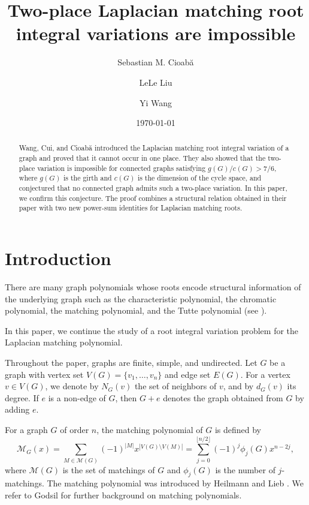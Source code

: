 \documentclass[11pt]{amsart}
\title{Two-place Laplacian matching root integral variations are impossible}
\author[S.M. Cioab\u{a}]{Sebastian M. Cioab\u{a}}
\author[L. Liu]{LeLe Liu}
\author[Y. Wang]{Yi Wang}
\date{\today}
\numberwithin{equation}{section}
\newcommand{\MM}{\mathscr{M}}
\newcommand{\calM}{\mathcal{M}}
\begin{document}
\begin{abstract}
Wang, Cui, and Cioab\u{a} introduced the Laplacian matching root integral variation 
of a graph and proved that it cannot occur in one place. They also showed that the 
two-place variation is impossible for connected graphs satisfying $g(G)/c(G)>7/6$, where $g(G)$ is the girth and $c(G)$ is the
dimension of the cycle space, and conjectured that no connected graph admits such a two-place variation. In this 
paper, we confirm this conjecture. The proof combines a structural relation obtained 
in their paper with two new power-sum identities for Laplacian matching roots.
\end{abstract}

\maketitle

\section{Introduction}

There are many graph polynomials whose roots encode structural information of the underlying graph such as the characteristic polynomial, the chromatic polynomial, the matching polynomial, and the Tutte polynomial (see \cite{EMM}). 

In this paper, we continue the study of a root integral variation problem for the Laplacian matching polynomial.

Throughout the paper, graphs are finite, simple, and undirected. Let $G$ be a graph with
vertex set $V(G)=\{v_1,\dots,v_n\}$ and edge set $E(G)$. For a vertex $v\in V(G)$, 
we denote by $N_G(v)$ the set of neighbors of $v$, and by $d_G(v)$ its degree. 
If $e$ is a non-edge of $G$, then $G+e$ denotes the graph obtained from $G$ by adding $e$.

For a graph $G$ of order $n$, the matching polynomial of $G$ is defined by
\begin{equation}\label{eq:matching}
\MM_G(x)=\sum_{M\in \calM(G)}(-1)^{|M|}x^{|V(G)\setminus V(M)|}
=\sum_{j=0}^{\lfloor n/2\rfloor}(-1)^j\phi_j(G)x^{n-2j},
\end{equation}
where $\calM(G)$ is the set of matchings of $G$ and $\phi_j(G)$ is the number of 
$j$-matchings. The matching polynomial was introduced by Heilmann and Lieb \cite{HL}. 
We refer to Godsil \cite{Godsil1} for further background on matching polynomials.
\end{document}

